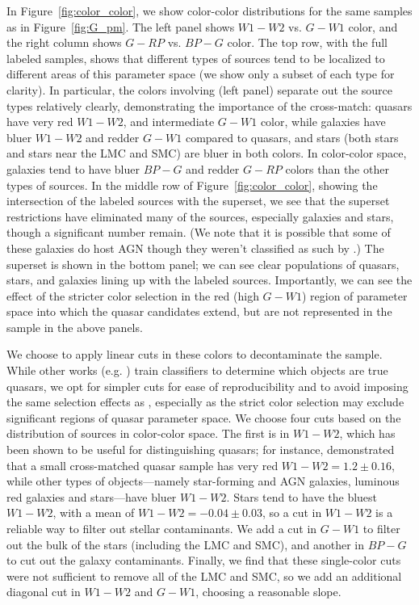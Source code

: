 In Figure~\ref{fig:color_color}, we show color-color distributions for the same samples as in Figure~\ref{fig:G_pm}.
The left panel shows $W1-W2$ vs. $G-W1$ color, and the right column shows $G-RP$ vs. $BP-G$ color.
The top row, with the full labeled samples, shows that different types of sources tend to be localized to different areas of this parameter space (we show only a subset of each type for clarity).
In particular, the colors involving \unWISE (left panel) separate out the source types relatively clearly, demonstrating the importance of the \unWISE cross-match: \SDSS quasars have very red $W1-W2$, and intermediate $G-W1$ color, while galaxies have bluer $W1-W2$ and redder $G-W1$ compared to quasars, and stars (both \SDSS stars and stars near the LMC and SMC) are bluer in both colors.
In \Gaia color-color space, galaxies tend to have bluer $BP-G$ and redder $G-RP$ colors than the other types of sources.
In the middle row of Figure~\ref{fig:color_color}, showing the intersection of the labeled sources with the \cat superset, we see that the superset restrictions have eliminated many of the sources, especially \SDSS galaxies and stars, though a significant number remain.
(We note that it is possible that some of these \SDSS galaxies do host AGN though they weren't classified as such by \SDSS.)
The \cat superset is shown in the bottom panel; we can see clear populations of quasars, stars, and galaxies lining up with the labeled sources.
Importantly, we can see the effect of the stricter \SDSS color selection in the red (high $G-W1$) region of parameter space into which the \Gaia quasar candidates extend, but are not represented in the \SDSS sample in the above panels.

We choose to apply linear cuts in these colors to decontaminate the sample.
While other works (e.g. \citealt{hughes_quasar_2022}) train classifiers to determine which objects are true quasars, we opt for simpler cuts for ease of reproducibility and to avoid imposing the same selection effects as \SDSS, especially as the strict \SDSS color selection may exclude significant regions of quasar parameter space.
We choose four cuts based on the distribution of sources in color-color space. 
The first is in $W1-W2$, which has been shown to be useful for distinguishing quasars; for instance, \cite{nikutta_meaning_2014} demonstrated that a small cross-matched \SDSS quasar sample has very red $W1-W2=1.2 \pm 0.16$, while other types of objects---namely star-forming and AGN galaxies, luminous red galaxies and stars---have bluer $W1-W2$.
Stars tend to have the bluest $W1-W2$, with a mean of $W1-W2=-0.04 \pm 0.03$, so a cut in $W1-W2$ is a reliable way to filter out stellar contaminants.
We add a cut in $G-W1$ to filter out the bulk of the stars (including the LMC and SMC), and another in $BP-G$ to cut out the galaxy contaminants.
Finally, we find that these single-color cuts were not sufficient to remove all of the LMC and SMC, so we add an additional diagonal cut in $W1-W2$ and $G-W1$, choosing a reasonable slope.

